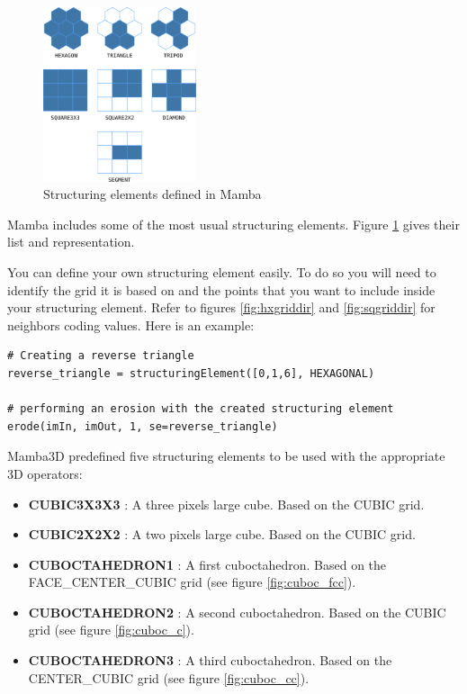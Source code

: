 \documentclass[a4paper,10pt,oneside]{article}
\begin{document}
\begin{figure}
\centering
\includegraphics[width=0.4\textwidth]{figures/se.pdf}
\caption{Structuring elements defined in Mamba}
\label{fig:se}
\end{figure}

Mamba includes some of the most usual structuring elements. Figure
\ref{fig:se} gives their list and representation.

You can define your own structuring element easily. To do so you will need to
identify the grid it is based on and the points that you want to include 
inside your structuring element. Refer to figures \ref{fig:hxgriddir} and 
\ref{fig:sqgriddir} for neighbors coding values. Here is an example:

\lstset{language=Python}
\begin{lstlisting}
# Creating a reverse triangle
reverse_triangle = structuringElement([0,1,6], HEXAGONAL)

# performing an erosion with the created structuring element
erode(imIn, imOut, 1, se=reverse_triangle)
\end{lstlisting}



Mamba3D predefined five structuring elements to be used with the appropriate
3D operators:

\begin{itemize}
\item \textbf{CUBIC3X3X3} : A three pixels large cube. Based on the CUBIC grid.
\item \textbf{CUBIC2X2X2} : A two pixels large cube. Based on the CUBIC grid.
\item \textbf{CUBOCTAHEDRON1} : A first cuboctahedron. Based on the
FACE\_CENTER\_CUBIC grid (see figure \ref{fig:cuboc_fcc}).
\item \textbf{CUBOCTAHEDRON2} : A second cuboctahedron. Based on the
CUBIC grid (see figure \ref{fig:cuboc_c}).
\item \textbf{CUBOCTAHEDRON3} : A third cuboctahedron. Based on the
CENTER\_CUBIC grid (see figure \ref{fig:cuboc_cc}).
\end{itemize}
\end{document}
